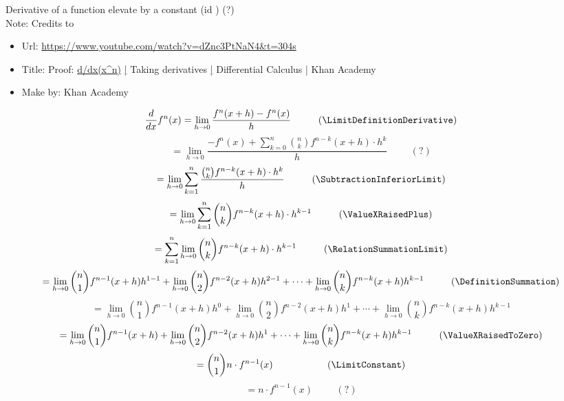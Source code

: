 \documentclass{book}
\begin{document}
                    Derivative of a function elevate by a constant (id \DerivativeFunctionElevateConstant) (?) \\

                    Note: Credits to
                    \begin{itemize}
                        \item Url: \url{https://www.youtube.com/watch?v=dZnc3PtNaN4&t=304s}
                        \item Title: Proof: \url{d/dx(x^n)} \url{|} Taking derivatives \url{|} Differential Calculus \url{|} Khan Academy
                        \item Make by: Khan Academy
                    \end{itemize}
                    
                    \[\frac{d}{dx} f^n(x) = \lim_{h \rightarrow 0} \frac{f^n(x + h) - f^n(x)}{h} \hspace{1cm} (\LimitDefinitionDerivative)\]
                    \[= \lim_{h \rightarrow 0} \frac{-f^n(x) + \sum^n_{k=0} \binom{n}{k} f^{n - k}(x + h) \cdot h^k}{h} \hspace{1cm} (?)\]
                    \[= \lim_{h \rightarrow 0} \sum^n_{k=1} \frac{\binom{n}{k} f^{n - k}(x + h) \cdot h^k}{h} \hspace{1cm} (\SubtractionInferiorLimit)\]
                    \[= \lim_{h \rightarrow 0} \sum^n_{k=1} \binom{n}{k} f^{n - k}(x + h) \cdot h^{k - 1} \hspace{1cm} (\ValueXRaisedPlus)\]
                    \[= \sum^n_{k=1} \lim_{h \rightarrow 0} \binom{n}{k} f^{n - k} (x + h) \cdot h^{k - 1} \hspace{1cm} (\RelationSummationLimit)\]
                    \[= \lim_{h \rightarrow 0} \binom{n}{1} f^{n - 1}(x + h) h^{1 - 1} + \lim_{h \rightarrow 0} \binom{n}{2} f^{n - 2}(x + h) h^{2 - 1} + \cdots + \lim_{h \rightarrow 0}\binom{n}{k} f^{n - k}(x + h) h^{k - 1} \hspace{1cm} (\DefinitionSummation)\]
                    \[= \lim_{h \rightarrow 0} \binom{n}{1} f^{n - 1}(x + h) h^0 + \lim_{h \rightarrow 0} \binom{n}{2} f^{n - 2} (x + h) h^1 + \cdots + \lim_{h \rightarrow 0} \binom{n}{k} f^{n - k}(x + h) h^{k - 1}\]
                    \[= \lim_{h \rightarrow 0} \binom{n}{1} f^{n - 1}(x + h) + \lim_{h \rightarrow 0} \binom{n}{2} f^{n - 2}(x + h) h^1 + \cdots + \lim_{h \rightarrow 0} \binom{n}{k} f^{n - k}(x + h) h^{k - 1} \hspace{1cm} (\ValueXRaisedToZero)\]
                    \[= \binom{n}{1} n \cdot f^{n - 1}(x) \hspace{1cm} \hspace{1cm} (\LimitConstant)\]
                    \[= n \cdot f^{n - 1}(x) \hspace{1cm} (?)\]
\end{document}

